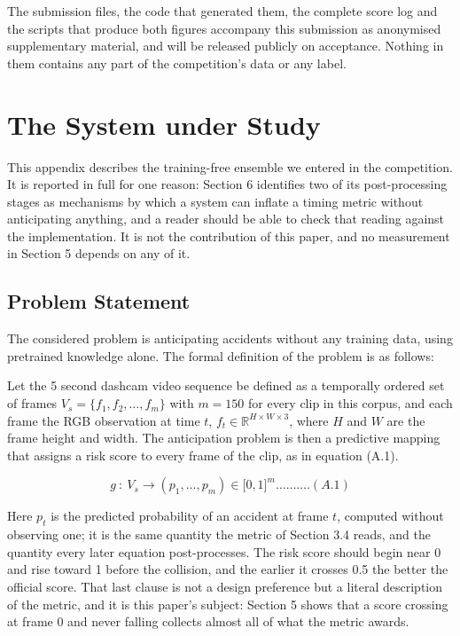 The submission files, the code that generated them, the complete score log and the scripts that produce both figures accompany this submission as anonymised supplementary material, and will be released publicly on acceptance. Nothing in them contains any part of the competition's data or any label.


\appendix

\section{The System under Study}

This appendix describes the training-free ensemble we entered in the
competition. It is reported in full for one reason: Section 6 identifies two
of its post-processing stages as mechanisms by which a system can inflate a
timing metric without anticipating anything, and a reader should be able to
check that reading against the implementation. It is not the contribution of this paper, and no measurement in
Section 5 depends on any of it.

\subsection{Problem Statement}

The considered problem is anticipating accidents without any training data, using pretrained knowledge alone. The formal definition of the problem is as follows:

Let the 5 second dashcam video sequence be defined as a temporally ordered set of frames \(V_{s} = \{ f_{1},f_{2},\ldots,f_{m}\}\) with \(m = 150\) for every clip in this corpus, and each frame the RGB observation at time \(t\), \(f_{t} \in \mathbb{R}^{H \times W \times 3}\), where \(H\) and \(W\) are the frame height and width. The anticipation problem is then a predictive mapping that assigns a risk score to every frame of the clip, as in equation (A.1).

\[g\ :\ V_{s} \longrightarrow \left( p_{1},\ldots,p_{m} \right) \in \lbrack 0,1\rbrack^{m}\ldots\ldots\ldots.(A.1)\]

Here \(p_{t}\) is the predicted probability of an accident at frame \(t\), computed without observing one; it is the same quantity the metric of Section 3.4 reads, and the quantity every later equation post-processes. The risk score should begin near 0 and rise toward 1 before the collision, and the earlier it crosses 0.5 the better the official score. That last clause is not a design preference but a literal description of the metric, and it is this paper's subject: Section 5 shows that a score crossing at frame 0 and never falling collects almost all of what the metric awards.

